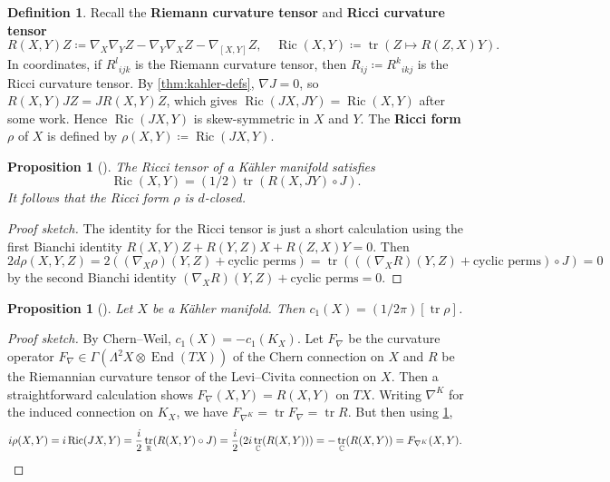 \documentclass{report}
\theoremstyle{plain}
\newtheorem{proposition}[theorem]{Proposition}
\theoremstyle{definition}
\newtheorem{definition}[theorem]{Definition}
\theoremstyle{remark}
\newcommand{\bC}{\mathbb{C}}
\newcommand{\bR}{\mathbb{R}}
\DeclareMathOperator{\End}{End}
\DeclareMathOperator{\tr}{tr}
\DeclareMathOperator{\Ric}{Ric}
\begin{document}
\begin{definition}
  Recall the {\bf Riemann curvature tensor} and {\bf Ricci curvature
    tensor}
  \[ R(X,Y)Z \coloneqq \nabla_X\nabla_YZ - \nabla_Y\nabla_XZ - \nabla_{[X,Y]}Z, \quad \Ric(X,Y) \coloneqq \tr(Z \mapsto R(Z,X)Y). \]
  In coordinates, if ${R^l}_{ijk}$ is the Riemann curvature tensor,
  then $R_{ij}\coloneqq {R^k}_{ikj}$ is the Ricci curvature tensor. By
  \ref{thm:kahler-defs}, $\nabla J = 0$, so $R(X,Y)JZ = JR(X,Y)Z$,
  which gives $\Ric(JX, JY) = \Ric(X, Y)$ after some work. Hence
  $\Ric(JX, Y)$ is skew-symmetric in $X$ and $Y$. The {\bf Ricci form}
  $\rho$ of $X$ is defined by $\rho(X, Y)\coloneqq \Ric(JX, Y)$.
\end{definition}

\begin{proposition}[{\cite[Proposition 12.2]{Moroianu2007}}] \label{thm:ricci-form-closed}
  The Ricci tensor of a K\"ahler manifold satisfies
  \[ \Ric(X, Y) = (1/2)\tr(R(X, JY) \circ J). \]
  It follows that the Ricci form $\rho$ is $d$-closed.
\end{proposition}

\begin{proof}[Proof sketch]
  The identity for the Ricci tensor is just a short calculation using
  the first Bianchi identity $R(X,Y)Z + R(Y,Z)X + R(Z,X)Y = 0$. Then
  \[ 2d\rho(X, Y, Z) = 2((\nabla_X \rho)(Y, Z) + \text{cyclic perms}) = \tr(((\nabla_X R)(Y, Z) + \text{cyclic perms}) \circ J) = 0 \]
  by the second Bianchi identity $(\nabla_X R)(Y, Z) + \text{cyclic
    perms} = 0$.
\end{proof}

\begin{proposition}[{\cite[Proposition 17.4]{Moroianu2007}}] \label{thm:chern-curvature-is-ricci}
  Let $X$ be a K\"ahler manifold. Then $c_1(X) = (1/2\pi)[\tr \rho]$.
\end{proposition}

\begin{proof}[Proof sketch]
  By Chern--Weil, $c_1(X) = -c_1(K_X)$. Let $F_\nabla$ be the
  curvature operator $F_\nabla \in \Gamma(\Lambda^2 X
  \otimes \End(TX))$ of the Chern connection on $X$ and $R$ be the
  Riemannian curvature tensor of the Levi--Civita connection on $X$.
  Then a straightforward calculation shows $F_\nabla(X,Y) = R(X,Y)$ on
  $TX$. Writing $\nabla^K$ for the induced connection on $K_X$, we
  have $F_{\nabla^K} = \tr F_\nabla = \tr R$. But then using
  \ref{thm:ricci-form-closed},
  \[ i\rho(X, Y) = i\Ric(JX, Y) = \frac{i}{2} \tr_{\bR}(R(X, Y) \circ J) = \frac{i}{2}(2i \tr_{\bC}(R(X, Y))) = -\tr_{\bC}(R(X, Y)) = F_{\nabla^K}(X, Y). \qedhere \]
\end{proof}
\end{document}
